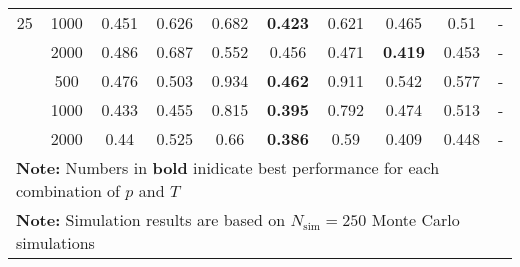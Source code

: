\begin{landscape}
\begin{table}[p]
\begin{tabular}{cccccccccc}
	 25  & 1000 &       0.451        &           0.626           &            0.682            & \textbf{0.423}            &            0.621            & 0.465                  &           0.51           & -                 \\ \hdashline
	 25  & 2000 &       0.486        &           0.687           &            0.552            & 0.456                     &            0.471            & \textbf{0.419}         &          0.453           & -                 \\ \hdashline
	 36  & 500  &       0.476        &           0.503           &            0.934            & \textbf{0.462}            &            0.911            & 0.542                  &          0.577           & -                 \\ \hdashline
	 36  & 1000 &       0.433        &           0.455           &            0.815            & \textbf{0.395}            &            0.792            & 0.474                  &          0.513           & -                 \\ \hdashline
	 36  & 2000 &        0.44        &           0.525           &            0.66             & \textbf{0.386}            &            0.59             & 0.409                  &          0.448           & -                 \\
	\hline
	\hline
    \multicolumn{10}{l}{\textbf{Note:} Numbers in \textbf{bold} inidicate best performance for each combination of $p$ and $T$} \\
    \multicolumn{10}{l}{\textbf{Note:} Simulation results are based on $N_\text{sim} = 250$ Monte Carlo simulations}
    \end{tabular}
    \end{table}
    \egroup
\end{landscape}
    